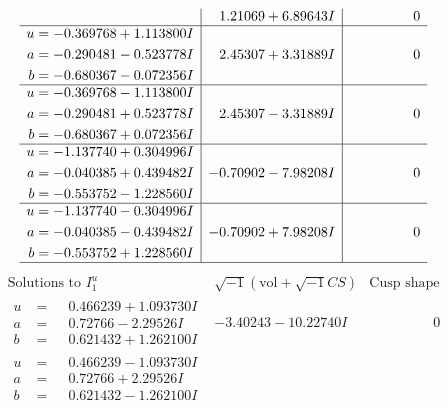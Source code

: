 \documentclass[1p]{elsarticle_modified}
\theoremstyle{definition}
\newcommand{\I}{\sqrt{-1}}
\begin{document}
$$\begin{array}{c|c|c}
 & \phantom{-}1.21069 + 6.89643 I & \phantom{-0.000000 } 0 \\ \hline\begin{aligned}
u &= -0.369768 + 1.113800 I \\
a &= -0.290481 - 0.523778 I \\
b &= -0.680367 - 0.072356 I\end{aligned}
 & \phantom{-}2.45307 + 3.31889 I & \phantom{-0.000000 } 0 \\ \hline\begin{aligned}
u &= -0.369768 - 1.113800 I \\
a &= -0.290481 + 0.523778 I \\
b &= -0.680367 + 0.072356 I\end{aligned}
 & \phantom{-}2.45307 - 3.31889 I & \phantom{-0.000000 } 0 \\ \hline\begin{aligned}
u &= -1.137740 + 0.304996 I \\
a &= -0.040385 + 0.439482 I \\
b &= -0.553752 - 1.228560 I\end{aligned}
 & -0.70902 - 7.98208 I & \phantom{-0.000000 } 0 \\ \hline\begin{aligned}
u &= -1.137740 - 0.304996 I \\
a &= -0.040385 - 0.439482 I \\
b &= -0.553752 + 1.228560 I\end{aligned}
 & -0.70902 + 7.98208 I & \phantom{-0.000000 } 0\\
 \hline 
 \end{array}$$\newpage$$\begin{array}{c|c|c}  
\text{Solutions to }I^u_{1}& \I (\text{vol} + \sqrt{-1}CS) & \text{Cusp shape}\\
 \hline 
\begin{aligned}
u &= \phantom{-}0.466239 + 1.093730 I \\
a &= \phantom{-}0.72766 - 2.29526 I \\
b &= \phantom{-}0.621432 + 1.262100 I\end{aligned}
 & -3.40243 - 10.22740 I & \phantom{-0.000000 } 0 \\ \hline\begin{aligned}
u &= \phantom{-}0.466239 - 1.093730 I \\
a &= \phantom{-}0.72766 + 2.29526 I \\
b &= \phantom{-}0.621432 - 1.262100 I\end{aligned}

\end{array}$$
\end{document}
